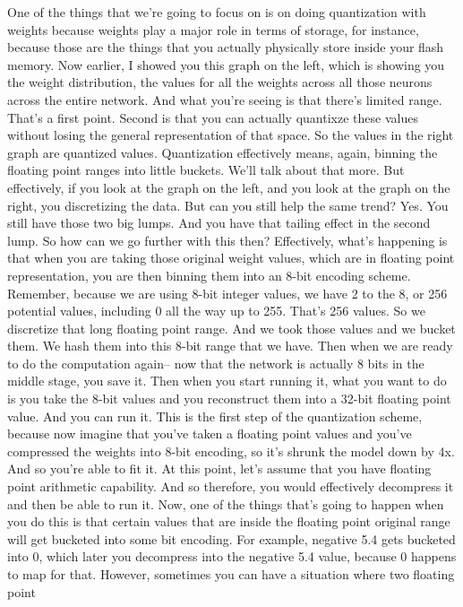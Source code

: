 One of the things that we're going to focus on
is on doing quantization with weights because weights
play a major role in terms of storage, for instance,
because those are the things that you actually physically
store inside your flash memory.
Now earlier, I showed you this graph on the left, which
is showing you the weight distribution, the values for all the weights
across all those neurons across the entire network.
And what you're seeing is that there's limited range.
That's a first point.
Second is that you can actually quantixze these values
without losing the general representation of that space.
So the values in the right graph are quantized values.
Quantization effectively means, again, binning the floating point ranges
into little buckets.
We'll talk about that more.
But effectively, if you look at the graph on the left,
and you look at the graph on the right, you discretizing the data.
But can you still help the same trend?
Yes.
You still have those two big lumps.
And you have that tailing effect in the second lump.
So how can we go further with this then?
Effectively, what's happening is that when
you are taking those original weight values, which are in floating point
representation, you are then binning them into an 8-bit encoding scheme.
Remember, because we are using 8-bit integer values,
we have 2 to the 8, or 256 potential values,
including 0 all the way up to 255.
That's 256 values.
So we discretize that long floating point range.
And we took those values and we bucket them.
We hash them into this 8-bit range that we have.
Then when we are ready to do the computation again--
now that the network is actually 8 bits in the middle stage, you save it.
Then when you start running it, what you want to do is you take the 8-bit values
and you reconstruct them into a 32-bit floating point value.
And you can run it.
This is the first step of the quantization scheme,
because now imagine that you've taken a floating point values
and you've compressed the weights into 8-bit encoding,
so it's shrunk the model down by 4x.
And so you're able to fit it.
At this point, let's assume that you have floating point arithmetic
capability.
And so therefore, you would effectively decompress it and then
be able to run it.
Now, one of the things that's going to happen
when you do this is that certain values that are inside the floating point
original range will get bucketed into some bit encoding.
For example, negative 5.4 gets bucketed into 0, which later you
decompress into the negative 5.4 value, because 0 happens to map for that.
However, sometimes you can have a situation where two floating point
